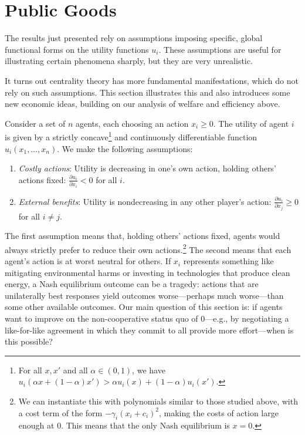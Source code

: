 \documentclass{notices}
\theoremstyle{definition}\newtheorem{problem}{Problem}
\theoremstyle{definition} \newtheorem{remark}{Remark}
\theoremstyle{definition} \newtheorem{claim}{Claim}
\theoremstyle{definition} \newtheorem{thm}{Theorem}
\theoremstyle{definition} \newtheorem*{thmNoNum}{Theorem}
\theoremstyle{definition} \newtheorem{definition}{Definition}
\theoremstyle{definition} \theoremstyle{remark}
\theoremstyle{definition} \newtheorem{note}{Note}
\theoremstyle{definition} \newtheorem{notation}{Notation}
\theoremstyle{definition} \theoremstyle{plain}
\theoremstyle{definition} \newtheorem{condition}{Condition}
\theoremstyle{definition} \newtheorem{lem}{Lemma}
\theoremstyle{definition} \newtheorem{corollary}{Corollary}
\theoremstyle{definition} \newtheorem{prop}{Proposition}
\theoremstyle{definition} \newtheorem{ax}{Axiom}
\theoremstyle{definition} \newtheorem{assumption}{Assumption}
\theoremstyle{definition} \newtheorem{example}{Example}
\theoremstyle{definition} \newtheorem{rmk}{Remark}
\theoremstyle{definition} \newtheorem{res}{Result}
\theoremstyle{definition} \newtheorem{que}{Question}
\theoremstyle{definition} \newtheorem{conjecture}{Conjecture}
\theoremstyle{definition}
\begin{document}
\section*{Public Goods}


The results just presented rely on assumptions imposing specific, global functional forms on the utility functions $u_i$. These assumptions are useful for illustrating certain phenomena sharply, but they are very unrealistic. 


It turns out centrality theory has more fundamental manifestations, which do not rely on such assumptions. This section illustrates this and also introduces some new economic ideas, building on our analysis of welfare and efficiency above.


Consider a set of $n$ agents, each choosing an action $x_i \geq 0$. The utility of agent $i$ is given by a strictly concave\footnote{For all $x,x'$ and all $\alpha \in (0,1)$, we have $u_i(\alpha x +(1-\alpha)x')>\alpha u_i(x) + (1-\alpha)u_i(x')$.} and continuously differentiable function $u_i(x_1, \ldots, x_n)$. We make the following assumptions:
\begin{enumerate}
    \item \emph{Costly actions}: Utility is decreasing in one's own action, holding others' actions fixed: $\frac{\partial u_i}{\partial x_i} < 0$ for all $i$.
    \item \emph{External benefits}: Utility is nondecreasing in any other player's action: $\frac{\partial u_i}{\partial x_j} \geq 0$ for all $i \neq j$.
\end{enumerate} 
The first assumption means that, holding others' actions fixed, agents would always strictly prefer to reduce their own actions.\footnote{We can instantiate this with polynomials similar to those studied above, with a cost term of the form $-\gamma_i(x_i+c_i)^2$, making the costs of action large enough at $0$. This means that the only Nash equilibrium is $x=0$.} The second means that each agent's action is at worst neutral for others.  If $x_i$ represents something like mitigating environmental harms or investing in technologies that produce clean energy, a Nash equilibrium outcome can be a tragedy: actions that are unilaterally best responses yield outcomes worse---perhaps much worse---than some other available outcomes. Our main question of this section is: if agents want to improve on the non-cooperative status quo of $0$---e.g., by negotiating a like-for-like agreement in which they commit to all provide more effort---when is this possible?
\end{document}
